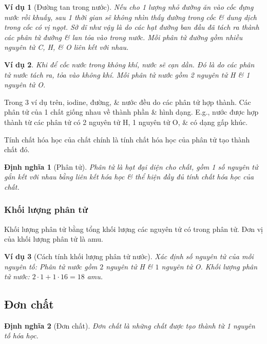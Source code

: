 \documentclass{article}
\newtheorem{dinhnghia}{Định nghĩa}
\newtheorem{vidu}{Ví dụ}
\begin{document}
\begin{vidu}[Đường tan trong nước]
	Nếu cho 1 lượng nhỏ đường ăn \emph{} vào cốc đựng nước rồi khuấy, sau 1 thời gian sẽ không nhìn thấy đường trong cốc \& dung dịch trong cốc có vị ngọt. Sở dĩ như vậy là do các hạt đường ban đầu đã tách ra thành các phân tử đường \& lan tỏa vào trong nước. Mỗi phân tử đường gồm nhiều nguyên tử \emph{C, H}, \& \emph{O} liên kết với nhau.
\end{vidu}

\begin{vidu}
	Khi để cốc nước \emph{} trong không khí, nước sẽ cạn dần. Đó là do các phân tử nước tách ra, tỏa vào không khí. Mỗi phân tử nước gồm 2 nguyên tử \emph{H} \& 1 nguyên tử \emph{O}.
\end{vidu}
Trong 3 ví dụ trên, iodine, đường, \& nước đều do các phân tử hợp thành. Các phân tử của 1 chất giống nhau về thành phần \& hình dạng. E.g., nước được hợp thành từ các phân tử có 2 nguyên tử H, 1 nguyên tử O, \& có dạng gấp khúc.

Tính chất hóa học của chất chính là tính chất hóa học của phân tử tạo thành chất đó.

\begin{dinhnghia}[Phân tử]
	\emph{Phân tử} là hạt đại diện cho chất, gồm 1 số nguyên tử gắn kết với nhau bằng liên kết hóa học \& thể hiện đầy đủ tính chất hóa học của chất.
\end{dinhnghia}

\subsubsection{Khối lượng phân tử}
Khối lượng phân tử bằng tổng khối lượng các nguyên tử có trong phân tử. Đơn vị của khối lượng phân tử là amu.

\begin{vidu}[Cách tính khối lượng phân tử nước]
	Xác định số nguyên tử của mỗi nguyên tố: Phân tử nước gồm $2$ nguyên tử \emph{H} \& $1$ nguyên tử \emph{O}. Khối lượng phân tử nước: $2\cdot1 +1\cdot16 = 18$ amu.
\end{vidu}

\subsection{Đơn chất}

\begin{dinhnghia}[Đơn chất]
	\emph{Đơn chất} là những chất được tạo thành từ 1 nguyên tố hóa học.
\end{dinhnghia}
\end{document}
